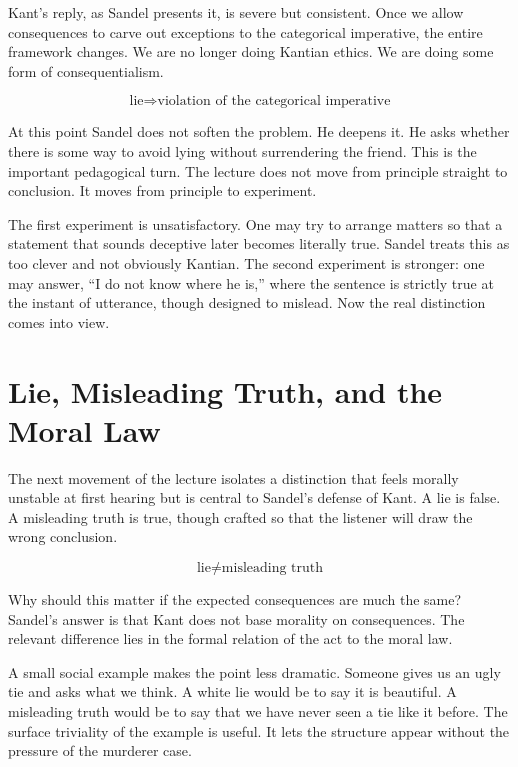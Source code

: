 Kant's reply, as Sandel presents it, is severe but consistent. Once we allow consequences to carve out exceptions to the categorical imperative, the entire framework changes. We are no longer doing Kantian ethics. We are doing some form of consequentialism.

\begin{equation}
\text{lie} \Longrightarrow \text{violation of the categorical imperative}
\end{equation}

At this point Sandel does not soften the problem. He deepens it. He asks whether there is some way to avoid lying without surrendering the friend. This is the important pedagogical turn. The lecture does not move from principle straight to conclusion. It moves from principle to experiment.

The first experiment is unsatisfactory. One may try to arrange matters so that a statement that sounds deceptive later becomes literally true. Sandel treats this as too clever and not obviously Kantian. The second experiment is stronger: one may answer, ``I do not know where he is,'' where the sentence is strictly true at the instant of utterance, though designed to mislead. Now the real distinction comes into view.

\section{Lie, Misleading Truth, and the Moral Law}

The next movement of the lecture isolates a distinction that feels morally unstable at first hearing but is central to Sandel's defense of Kant. A lie is false. A misleading truth is true, though crafted so that the listener will draw the wrong conclusion.

\begin{equation}
\text{lie} \neq \text{misleading truth}
\end{equation}

Why should this matter if the expected consequences are much the same? Sandel's answer is that Kant does not base morality on consequences. The relevant difference lies in the formal relation of the act to the moral law.

A small social example makes the point less dramatic. Someone gives us an ugly tie and asks what we think. A white lie would be to say it is beautiful. A misleading truth would be to say that we have never seen a tie like it before. The surface triviality of the example is useful. It lets the structure appear without the pressure of the murderer case.

